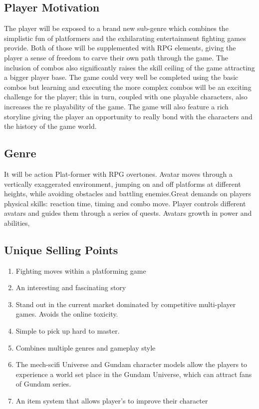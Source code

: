 \documentclass{article}
\begin{document}
\subsection*{Player Motivation}
The player will be exposed to a brand new sub-genre which combines the simplistic fun of platformers and the exhilarating entertainment fighting games provide. Both of those will be supplemented with RPG elements, giving the player a sense of freedom to carve their own path through the game. The inclusion of combos also significantly raises the skill ceiling of the game attracting a bigger player base. The game could very well be completed using the basic combos but learning and executing the more complex combos will be an exciting challenge for the player; this in turn, coupled with one playable characters, also increases the re playability of the game. The game will also feature a rich storyline giving the player an opportunity to really bond with the characters and the history of the game world. 

\subsection*{Genre}
It will be action Plat-former with RPG overtones. Avatar moves through a vertically exaggerated environment, jumping on and off platforms at different heights, while avoiding obstacles and battling enemies.Great demands on players physical skills: reaction time, timing and combo move.
Player controls different avatars and guides them through a series of quests. Avatars growth in power and abilities,

\subsection*{Unique Selling Points}
    \begin{enumerate}
        \item Fighting moves within a platforming game
        \item An interesting and fascinating story 
        \item Stand out in the current market dominated by competitive multi-player games. Avoids the online toxicity.
        \item Simple to pick up hard to master.
        \item Combines multiple genres and gameplay style
        \item The mech-scifi Universe and Gundam character models allow the players to experience a world set place in the Gundam Universe, which can attract fans of Gundam series.
        \item An item system that allows player's to improve their character 
    \end{enumerate}
\end{document}
